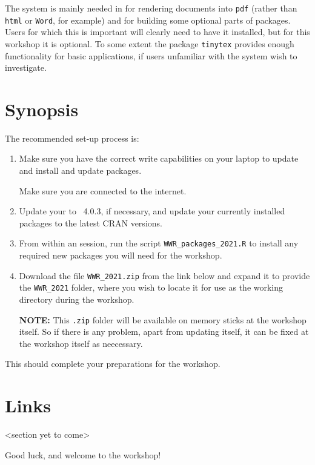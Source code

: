 \documentclass[12pt]{article}
\begin{document}
\begin{description}
  The system is mainly needed in \R for rendering documents into
  \verb|pdf| (rather than \verb|html| or \verb|Word|, for example) and
  for building some optional parts of \R packages.  Users for which
  this is important will clearly need to have it installed, but for
  this workshop it is optional.  To some extent the \R package
  \verb|tinytex| provides enough functionality for basic applications,
  if users unfamiliar with the system wish to investigate.
  

\end{description}

\section{Synopsis}
\label{sec:synopsis}

The recommended set-up process is:
  \begin{enumerate}
  \item Make sure you have the correct write capabilities on your
    laptop to update \R and install and update packages.

    Make sure you are connected to the internet.
  \item Update your \R to \R~4.0.3, if necessary, and update your
    currently installed packages to the latest CRAN versions.
    
  \item From within an \R session, run the script
    \verb|WWR_packages_2021.R| to install any required new packages
    you will need for the workshop.
    
  \item Download the file \verb|WWR_2021.zip| from the link below and
    expand it to provide the \verb|WWR_2021| folder, where you wish to
    locate it for use as the working directory during the workshop.

    \textbf{NOTE:} This {\tt .zip} folder will be available on memory
    sticks at the workshop itself.  So if there is any problem, apart
    from updating \R itself, it can be fixed at the workshop itself as
    neecessary.

 
  \end{enumerate}

    This should complete your preparations for the workshop.    

\section{Links}
\label{sec:links}

<section yet to come>

Good luck, and welcome to the workshop!
\end{document}
